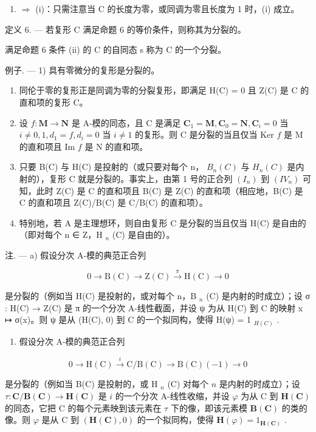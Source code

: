\begin{enumerate}
\def\labelenumi{(\roman{enumi})}
\setcounter{enumi}{3}
\tightlist
\item
  \(\Rightarrow\) (i)：只需注意当 C 的长度为零，或同调为零且长度为 1 时，(i) 成立。
\end{enumerate}

定义 6. --- 若复形 C 满足命题 6 的等价条件，则称其为分裂的。

满足命题 6 条件 (ii) 的 C 的自同态 s 称为 C 的一个分裂。

例子. --- 1) 具有零微分的复形是分裂的。

\begin{enumerate}
\def\labelenumi{\arabic{enumi})}
\setcounter{enumi}{1}
\item
  同伦于零的复形正是同调为零的分裂复形，即满足 H(C) = 0 且 Z(C) 是 C 的直和项的复形 C。
\item
  设 \(f: \mathbf{M} \to \mathbf{N}\) 是 A-模的同态，且 C 是满足 \(\mathbf{C}_1 = \mathbf{M}, \mathbf{C}_0 = \mathbf{N}, \mathbf{C}_i = 0\) 当 \(i \neq 0, 1, d_1 = f, d_i = 0\) 当 \(i \neq 1\) 的复形。则 C 是分裂的当且仅当 Ker \(f\) 是 M 的直和项且 Im \(f\) 是 N 的直和项。
\item
  只要 B(C) 与 H(C) 是投射的（或只要对每个 n， \(B_{n}(C)\) 与 \(H_{n}(C)\) 是内射的），复形 C 就是分裂的。事实上，由第 1 号的正合列 \((I_{n})\) 到 \((IV_{n})\) 可知，此时 Z(C) 是 C 的直和项且 B(C) 是 Z(C) 的直和项（相应地，B(C) 是 C 的直和项且 Z(C)/B(C) 是 C/B(C) 的直和项）。
\item
  特别地，若 A 是主理想环，则自由复形 C 是分裂的当且仅当 H(C) 是自由的（即对每个 n ∈ Z，H \(_{n}\) (C) 是自由的）。
\end{enumerate}

注. --- a) 假设分次 A-模的典范正合列

\[
0 \to \mathrm{B} (\mathrm{C}) \to \mathrm{Z} (\mathrm{C}) \xrightarrow {\pi} \mathrm{H} (\mathrm{C}) \to 0\tag{II}
\]

是分裂的（例如当 H(C) 是投射的，或对每个 n，B \(_{n}\) (C) 是内射的时成立）；设 σ : H(C) → Z(C) 是 π 的一个分次 A-线性截面，并设 ψ 为从 H(C) 到 C 的映射 x ↦ σ(x)。则 ψ 是从 (H(C), 0) 到 C 的一个拟同构，使得 H(ψ) = 1 \(_{H(C)}\) .

\begin{enumerate}
\def\labelenumi{\alph{enumi})}
\setcounter{enumi}{1}
\tightlist
\item
  假设分次 A-模的典范正合列
\end{enumerate}

\[
0 \rightarrow \mathrm{H} (\mathrm{C}) \stackrel {i} {\rightarrow} \mathrm{C} / \mathrm{B} (\mathrm{C}) \rightarrow \mathrm{B} (\mathrm{C}) (- 1) \rightarrow 0\tag{IV}
\]

是分裂的（例如当 B(C) 是投射的，或 H \(_{n}\) (C) 对每个 \(n\) 是内射的时成立）；设 \(\tau: \mathbf{C} / \mathbf{B}(\mathbf{C}) \to \mathbf{H}(\mathbf{C})\) 是 \(i\) 的一个分次 A-线性收缩，并设 \(\varphi\) 为从 C 到 \(\mathbf{H}(\mathbf{C})\) 的同态，它把 C 的每个元素映到该元素在 \(\tau\) 下的像，即该元素模 \(\mathbf{B}(\mathbf{C})\) 的类的像。则 \(\varphi\) 是从 C 到 \((\mathbf{H}(\mathbf{C}), 0)\) 的一个拟同构，使得 \(\mathbf{H}(\varphi) = 1_{\mathbf{H}(\mathbf{C})}\) .

